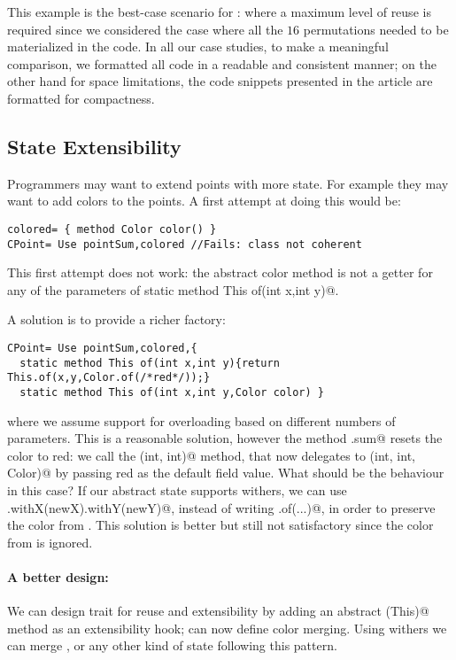 This example is the best-case scenario for \name: where a maximum level of reuse
 is required since we considered the case where all the $16$ permutations needed to be materialized in the code.
In all our case studies, to make a meaningful comparison, we formatted all code in a readable and consistent manner;
on the other hand for space limitations, the code snippets presented in the article
are formatted for compactness.


\subsection{State Extensibility}
Programmers may want to extend points with more state. For example 
they may want to add colors to the points. A first attempt at doing
this would be:
\saveSpace\saveSpace
\begin{lstlisting}
colored= { method Color color() }
CPoint= Use pointSum,colored //Fails: class not coherent
\end{lstlisting}
\saveSpace\saveSpace 
This first attempt does not work: the abstract color method
is not a getter for any of the parameters of 
\Q@ static method This of(int x,int y)@. 

\noindent
A solution is to provide a richer factory:
\saveSpace\saveSpace 
\begin{lstlisting}
CPoint= Use pointSum,colored,{
  static method This of(int x,int y){return This.of(x,y,Color.of(/*red*/));}
  static method This of(int x,int y,Color color) }
\end{lstlisting}
\saveSpace\saveSpace 
\noindent 
where we assume support for overloading based on different numbers of parameters.
This is a reasonable solution, however the method \Q@CPoint.sum@ resets
the color to red: we call the \Q@of(int, int)@ method, that now
delegates to \Q@of(int, int, Color)@ by passing red as the default field
value.  What should be the behaviour in this case?  If our abstract
state supports withers, we can use
\Q@this.withX(newX).withY(newY)@, instead of writing \Q@This.of(...)@, in order to preserve the color from
\Q@this@.  This solution is better but still not satisfactory since the color from \Q@that@ is ignored.

\paragraph{A better design:}
We can design trait \Q@p@ for reuse and extensibility
by adding an abstract \Q@merge(This)@ method as an extensibility hook;
\Q@colored@ can now define color merging.
Using withers we can merge \Q@color@s, or any other kind of state 
following this pattern.%

